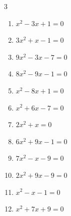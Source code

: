 \begin{multicols}{3}
\begin{enumerate}

  \item $x^{2}-3x+1=0$


\columnbreak %

  \item $3x^{2}+x-1=0$


  \item $9x^{2}-3x-7=0$


  \item $8x^{2}-9x-1=0$


  \item $x^{2}-8x+1=0$


  \item $x^{2}+6x-7=0$

        \phantom{$\displaystyle x=1, \; -7$}

  \item $2x^{2}+x=0$


  \item $6x^{2}+9x-1=0$


\columnbreak %

\resetques

  \item $7x^{2}-x-9=0$


  \item $2x^{2}+9x-9=0$


  \item $x^{2}-x-1=0$


  \item $x^{2}+7x+9=0$


\end{enumerate}
\end{multicols}
